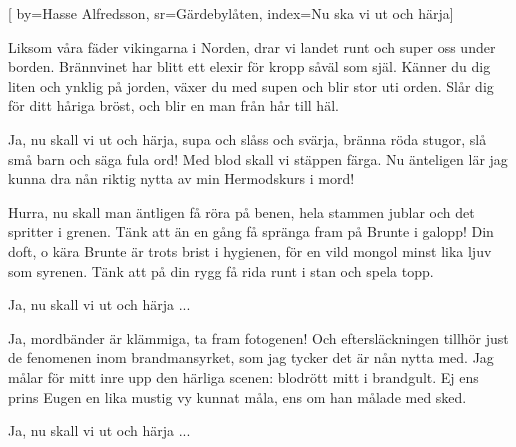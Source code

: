 [ 	
    by={Hasse Alfredsson},						
	sr={Gärdebylåten},					
	index={Nu ska vi ut och härja}]		

\beginverse*
Liksom våra fäder vikingarna i Norden,
drar vi landet runt och super oss under borden.
Brännvinet har blitt ett elexir 
för kropp såväl som själ.
Känner du dig liten och ynklig på jorden,
växer du med supen och blir stor uti orden.
Slår dig för ditt håriga bröst,
och blir en man från hår till häl.
\endverse

\beginchorus				
Ja, nu skall vi ut och härja,
supa och slåss och svärja,
bränna röda stugor, slå små barn
 och säga fula ord!
Med blod skall vi stäppen färga.
Nu änteligen lär jag
kunna dra nån riktig nytta av
min Hermodskurs i mord! 
\endchorus	

\beginverse					
Hurra, nu skall man äntligen få röra på benen,
hela stammen jublar och det spritter i grenen.
Tänk att än en gång få spränga fram
 på Brunte i galopp!
Din doft, o kära Brunte är trots brist i hygienen,
för en vild mongol minst lika ljuv som syrenen.
Tänk att på din rygg få rida runt
 i stan och spela topp. 
\endverse						

\beginchorus				
Ja, nu skall vi ut och härja ...
\endchorus	

\beginverse
Ja, mordbänder är klämmiga, ta fram fotogenen!
Och eftersläckningen tillhör just de fenomenen
inom brandmansyrket, som jag tycker 
det är nån nytta med.
Jag målar för mitt inre upp den härliga scenen: 
blodrött mitt i brandgult. Ej ens prins Eugen en
lika mustig vy kunnat måla, 
ens om han målade med sked. 
\endverse	

\beginchorus	
Ja, nu skall vi ut och härja ... 
\endchorus	

\vspace{5mm}
\endsong		
